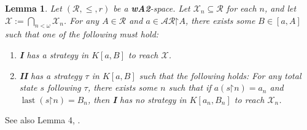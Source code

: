 \documentclass[11pt,reqno]{amsart}
\theoremstyle{plain}
\numberwithin{equation}{section}
\newtheorem{lemma}[theorem]{Lemma}
\theoremstyle{definition}
\newcommand{\func}{\operatorname}
\newcommand{\cal}{\mathcal}
\newcommand{\restrictedto}{\mathord{\upharpoonright}}
\newcommand{\X}{\cal{X}}
\newcommand{\last}{\func{last}}
\begin{document}
\begin{lemma}
\label{lem:kr.general.dichotomy}
    Let $(\cal{R},\leq,r)$ be a \textbf{wA2}-space. Let $\X_n \subseteq \cal{R}$ for each $n$, and let $\X := \bigcap_{n<\omega} \X_n$. For any $A \in \cal{R}$ and $a \in \cal{AR}\restrictedto A$, there exists some $B \in [a,A]$ such that one of the following must hold:
    \begin{enumerate}
        \item \textbf{I} has a strategy in $K[a,B]$ to reach $\X$.

        \item \textbf{II} has a strategy $\tau$ in $K[a,B]$ such that the following holds: For any total state $s$ following $\tau$, there exists some $n$ such that if $a(s\restrictedto n) = a_n$ and $\last(s\restrictedto n) = B_n$, then \textbf{I} has no strategy in $K[a_n,B_n]$ to reach $\X_n$.
    \end{enumerate}
\end{lemma}

See also Lemma 4, \cite{R08}.
\end{document}
